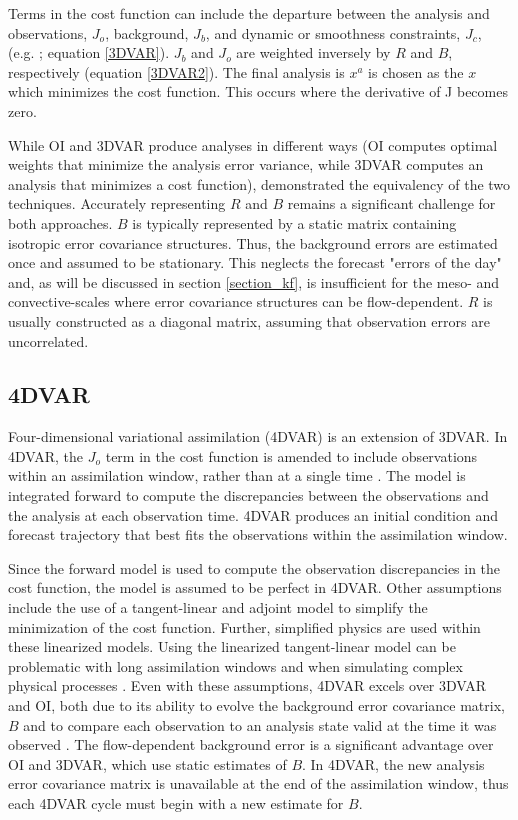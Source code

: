 Terms in the cost function can include the departure between the analysis and observations, \(J_o\), background, \(J_b\), and dynamic or smoothness constraints, \(J_c\), (e.g. \citealt{gaoetal03,geetal12}; equation \ref{3DVAR}). \(J_b\) and \(J_o\) are weighted inversely by \(R\) and \(B\), respectively (equation \ref{3DVAR2}). The final analysis is  \(x^a\) is chosen as the \(x\) which minimizes the cost function. This occurs where the derivative of J becomes zero.

While OI and 3DVAR produce analyses in different ways (OI computes optimal weights that minimize the analysis error variance, while 3DVAR computes an analysis that minimizes a cost function), \citet{lorenc86} demonstrated the equivalency of the two techniques. Accurately representing \(R\) and \(B\) remains a significant challenge for both approaches. \(B\) is typically represented by a static matrix containing isotropic error covariance structures. Thus, the background errors are estimated once and assumed to be stationary. This neglects the forecast "errors of the day" and, as will be discussed in section \ref{section_kf}, is insufficient for the meso- and convective-scales where error covariance structures can be flow-dependent.  \(R\) is usually constructed as a diagonal matrix, assuming that observation errors are uncorrelated.

\subsection{4DVAR}
Four-dimensional variational assimilation (4DVAR) is an extension of 3DVAR. In 4DVAR, the \(J_o\) term in the cost function is amended to include observations within an assimilation window, rather than at a single time \citep{talagrandcourtier87}. The model is integrated forward to compute the discrepancies between the observations and the analysis at each observation time. 4DVAR produces an initial condition and forecast trajectory that best fits the observations within the assimilation window.

Since the forward model is used to compute the observation discrepancies in the cost function, the model is assumed to be perfect in 4DVAR. Other assumptions include the use of a tangent-linear and adjoint model to simplify the minimization of the cost function. Further, simplified physics are used within these linearized models. Using the linearized tangent-linear model can be problematic with long assimilation windows and when simulating complex physical processes \citep{tremolet04}.  Even with these assumptions, 4DVAR excels over 3DVAR and OI, both due to its ability to evolve the background error covariance matrix, \(B\) and to compare each observation to an analysis state valid at the time it was observed \citep{lorenc05}. The flow-dependent background error is a significant advantage over OI and 3DVAR, which use static estimates of \(B\). In 4DVAR, the new analysis error covariance matrix is unavailable at the end of the assimilation window, thus each 4DVAR cycle must begin with a new estimate for \(B\).

